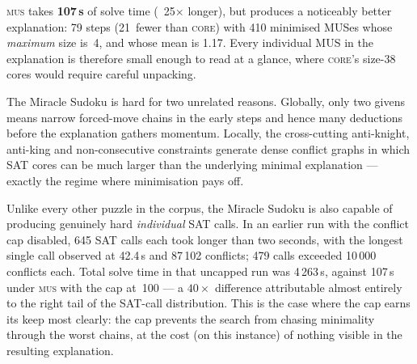 \textsc{mus} takes \textbf{107\,s} of solve time (~25$\times$
longer), but produces a noticeably better explanation: 79 steps
(21~fewer than \textsc{core}) with 410 minimised MUSes whose
\emph{maximum} size is~4, and whose mean is 1.17.  Every individual
MUS in the explanation is therefore small enough to read at a glance,
where \textsc{core}'s size-38 cores would require careful unpacking.

The Miracle Sudoku is hard for two unrelated reasons.  Globally, only
two givens means narrow forced-move chains in the early steps and
hence many deductions before the explanation gathers momentum.
Locally, the cross-cutting anti-knight, anti-king and
non-consecutive constraints generate dense conflict graphs in which
SAT cores can be much larger than the underlying minimal explanation
--- exactly the regime where minimisation pays off.

Unlike every other puzzle in the corpus, the Miracle Sudoku is also
capable of producing genuinely hard \emph{individual} SAT calls.  In
an earlier run with the conflict cap disabled, 645 SAT calls each
took longer than two seconds, with the longest single call observed
at 42.4\,s and 87\,102 conflicts; 479 calls exceeded 10\,000
conflicts each.  Total solve time in that uncapped run was
4\,263\,s, against 107\,s under \textsc{mus} with the cap at~100 ---
a $40\times$ difference attributable almost entirely to the right
tail of the SAT-call distribution.  This is the case where the cap
earns its keep most clearly: the cap prevents the search from
chasing minimality through the worst chains, at the cost (on this
instance) of nothing visible in the resulting explanation.
